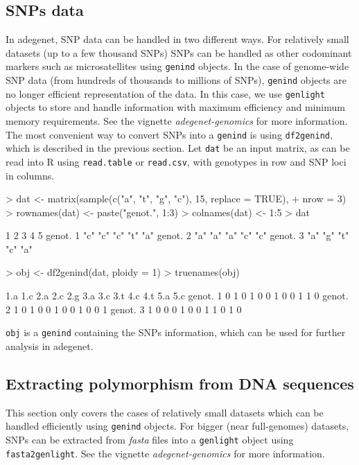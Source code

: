 \documentclass{article}
\begin{document}
\subsection{SNPs data}
In adegenet, SNP data can be handled in two different ways.
For relatively small datasets (up to a few thousand SNPs) SNPs can
be handled as other codominant markers such as microsatellites using \texttt{genind} objects.
In the case of genome-wide SNP data (from hundreds of thousands to millions of SNPs),
\texttt{genind} objects are no longer efficient representation of the data.
In this case, we use \texttt{genlight} objects to store and handle information with maximum
efficiency and minimum memory requirements. See the vignette \textit{adegenet-genomics} for more information.
\\

The most convenient way to convert SNPs into a \texttt{genind} is using \texttt{df2genind}, which is
described in the previous section.
Let \texttt{dat} be an input matrix, as can be read into R using \texttt{read.table} or \texttt{read.csv},
with genotypes in row and SNP loci in columns.
\begin{Schunk}
\begin{Sinput}
> dat <- matrix(sample(c("a", "t", "g", "c"), 15, replace = TRUE), 
+     nrow = 3)
> rownames(dat) <- paste("genot.", 1:3)
> colnames(dat) <- 1:5
> dat
\end{Sinput}
\begin{Soutput}
         1   2   3   4   5  
genot. 1 "c" "c" "c" "t" "a"
genot. 2 "a" "a" "a" "c" "c"
genot. 3 "a" "g" "t" "c" "a"
\end{Soutput}
\begin{Sinput}
> obj <- df2genind(dat, ploidy = 1)
> truenames(obj)
\end{Sinput}
\begin{Soutput}
         1.a 1.c 2.a 2.c 2.g 3.a 3.c 3.t 4.c 4.t 5.a 5.c
genot. 1   0   1   0   1   0   0   1   0   0   1   1   0
genot. 2   1   0   1   0   0   1   0   0   1   0   0   1
genot. 3   1   0   0   0   1   0   0   1   1   0   1   0
\end{Soutput}
\end{Schunk}

\texttt{obj} is a \texttt{genind} containing the SNPs information, which can be used for further
analysis in adegenet.



\subsection{Extracting polymorphism from DNA sequences}
This section only covers the cases of relatively small datasets which can be handled efficiently
using \texttt{genind} objects. For bigger (near full-genomes) datasets, SNPs can be extracted from
\textit{fasta} files into a \texttt{genlight} object using \texttt{fasta2genlight}.
See the vignette \textit{adegenet-genomics} for more information.
\\
\end{document}
